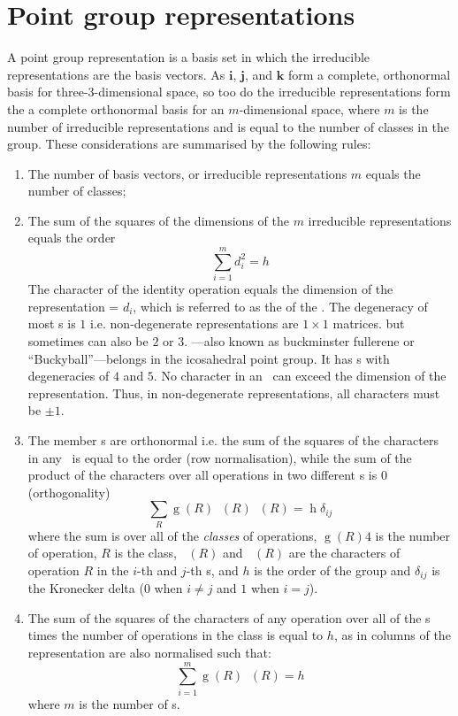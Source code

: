 \section{Point group representations}

A point group representation is a basis set in which the irreducible representations are the basis vectors.
As $\mathbf i$, $\mathbf j$, and $\mathbf k$ form a complete, orthonormal basis for three-3-dimensional space, so too do the irreducible representations form the a complete orthonormal basis for an $m$-dimensional space, where $m$ is the number of irreducible representations and is equal to the number of classes in the group.
These considerations are summarised by the following rules:

\begin{enumerate}
    \item The number of basis vectors, or irreducible representations $m$ equals the number of classes;
    \item The sum of the squares of the dimensions of the $m$ irreducible representations equals the order \[\sum_{i=1}^{m} d_i^2 = h\]
    The character of the identity operation equals the dimension of the representation  = $d_i$, which is referred to as the  of the \irrep. The degeneracy of most \irrep s is $1$ i.e. non-degenerate representations are $1\times1$ matrices. but sometimes can also be $2$ or $3$.
    ---also known as buckminster fullerene or “Buckyball”---belongs in the icosahedral point group.
    It has \irrep{}s with degeneracies of $4$ and $5$.
    No character in an \irrep\ can exceed the dimension of the representation.
    Thus, in non-degenerate representations, all characters must be $\pm1$.
    \item The member \irrep{}s are orthonormal i.e. the sum of the squares of the characters in any \irrep\ is equal to the order (row normalisation), while the sum of the product of the characters over all operations in two different \irrep{}s is $0$ (orthogonality) \[\sum_R \mathop{g}(R)\mathop{\chi_i}(R)\mathop{\chi_j}(R) = \mathop{h} \delta_{ij}\] where the sum is over all of the \emph{classes} of operations, $\mathop{g}(R)4$ is the number of operation, $R$ is the class, $\mathop{\chi_i}(R)$ and $\mathop{\chi_j}(R)$ are the characters of operation $R$ in the $i$-th and $j$-th \irrep{}s, and $h$ is the order of the group and $\delta_{ij}$ is the Kronecker delta ($0$ when $i\neq j$ and $1$ when $i=j$).
    \item The sum of the squares of the characters of any operation over all of the \irrep{}s times the number of operations in the class is equal to $h$, as in columns of the representation are also normalised such that: \[\sum^{m}_{i=1} \mathop{g}(R)\mathop{\chi^2_i}(R) = h\] where $m$ is the number of \irrep{}s.

\end{enumerate}
